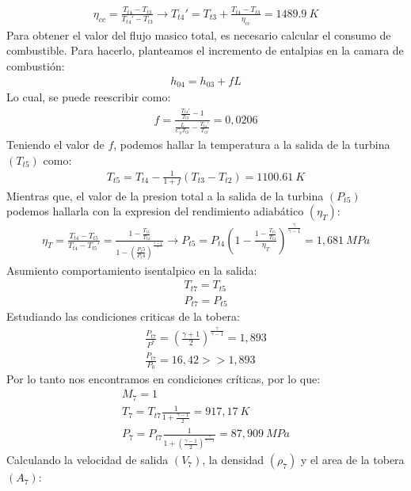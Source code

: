 \documentclass{report}
\begin{document}
\begin{gather}
  \eta_{cc}=\frac{T_{t4}-T_{t3}}{T_{t4}'-T_{t3}}\xrightarrow{}T_{t4}'=T_{t3}+\frac{T_{t4}-T_{t3}}{\eta_{cc}}=1489.9\:K
\end{gather}
Para obtener el valor del flujo masico total, es necesario calcular el consumo de combustible. Para hacerlo, planteamos el incremento de entalpias en la camara de combustión:
\begin{gather}
  h_{04}=h_{03}+fL
\end{gather}
Lo cual, se puede reescribir como:
\begin{gather}
  f=\frac{\frac{T_{t4}'}{T_{t3}}-1}{\frac{L}{C_p T_{t3}}-\frac{T_{t4}'}{T_{t3}}}=0,0206
\end{gather}
Teniendo el valor de $f$, podemos hallar la temperatura a la salida de la turbina $(T_{t5})$ como:
\begin{gather}
  T_{t5}=T_{t4}-\frac{1}{1+f}(T_{t3}-T_{t2})=1100.61\:K
\end{gather}
Mientras que, el valor de la presion total a la salida de la turbina $(P_{t5})$ podemos hallarla con la expresion del rendimiento adiabático $(\eta_T)$:
\begin{gather}
  \eta_T = \frac{T_{t4}-T_{t5}}{T_{t4}-T_{t5}'}=\frac{1-\frac{T_{t5}}{T_{t4}}}{1-\left(\frac{P_t5}{P_t4}\right)^\frac{\gamma-1}{\gamma}}\xrightarrow{}P_{t5}=P_{t4}\left(1-\frac{1-\frac{T_{t5}}{T_{t4}}}{\eta_T}\right)^\frac{\gamma}{\gamma-1}=1,681\:MPa
\end{gather}
Asumiento comportamiento isentalpico en la salida:
\begin{gather}
  T_{t7} = T_{t5}\\
  P_{t7} = P_{t5}
\end{gather}
Estudiando las condiciones criticas de la tobera:
\begin{gather}
  \frac{P_{t7}}{P^*}=\left(\frac{\gamma+1}{2}\right)^\frac{\gamma}{\gamma-1}=1,893\\
  \frac{P_{t7}}{P_0}=16,42 >> 1,893
\end{gather}
Por lo tanto nos encontramos en condiciones críticas, por lo que:
\begin{gather}
  M_7 = 1\\
  T_7 = T_{t7} \frac{1}{1 + \frac{\gamma - 1}{2}} = 917,17\:K\\
  P_7 = P_{t7} \frac{1}{1 + \left(\frac{\gamma - 1}{2}\right)^\frac{\gamma}{\gamma-1}}=87,909\:MPa
\end{gather}
Calculando la velocidad de salida $(V_7)$, la densidad $(\rho_7)$ y el area de la tobera $(A_7)$:
\end{document}

